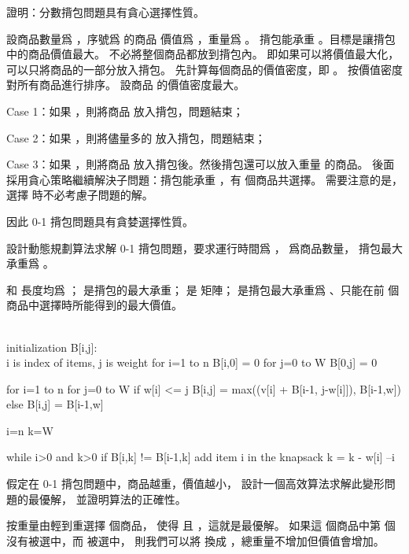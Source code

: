 \startsection[
  title={Elements of the greedy strategy},
]

\startEXERCISE
證明：分數揹包問題具有貪心選擇性質。
\stopEXERCISE

\startANSWER
設商品數量爲 ，序號爲  的商品
價值爲 ，重量爲 。
揹包能承重 。目標是讓揹包中的商品價值最大。
不必將整個商品都放到揹包內。
即如果可以將價值最大化，可以只將商品的一部分放入揹包。
先計算每個商品的價值密度，即 。
按價值密度對所有商品進行排序。
設商品  的價值密度最大。

\startigBase[n]
\item Case 1：如果 ，則將商品  放入揹包，問題結束；
\item Case 2：如果 ，則將儘量多的  放入揹包，問題結束；
\item Case 3：如果 ，則將商品  放入揹包後。然後揹包還可以放入重量  的商品。
後面採用貪心策略繼續解決子問題：揹包能承重 ，有  個商品共選擇。
需要注意的是，選擇  時不必考慮子問題的解。
\stopigBase

因此 0-1 揹包問題具有貪婪選擇性質。
\stopANSWER

\startEXERCISE
設計動態規劃算法求解 0-1 揹包問題，要求運行時間爲 ，  爲商品數量，
揹包最大承重爲 。
\stopEXERCISE

\startANSWER
{} 和  長度均爲 ；
  是揹包的最大承重；
  是  矩陣；
  是揹包最大承重爲 、只能在前  個商品中選擇時所能得到的最大價值。

\startCLRS
\\ initialization B[i,j]:
\\ i is index of items, j is weight
for i=1 to n
	B[i,0] = 0
for j=0 to W
	B[0,j] = 0

for i=1 to n
	for j=0 to W
		if w[i] <= j
			B[i,j] = max((v[i] + B[i-1, j-w[i]]), B[i-1,w])
		else
			B[i,j] = B[i-1,w]
\stopCLRS

\startCLRS
i=n
k=W

while i>0 and k>0
	if B[i,k] != B[i-1,k]
		add item i in the knapsack
		k = k - w[i]
	--i
\stopCLRS

\stopANSWER

\startEXERCISE
假定在 0-1 揹包問題中，商品越重，價值越小，
設計一個高效算法求解此變形問題的最優解，
並證明算法的正確性。
\stopEXERCISE

\startANSWER
按重量由輕到重選擇  個商品，
使得  且 ，這就是最優解。
如果這  個商品中第  個沒有被選中，而  被選中，
則我們可以將  換成 ，總重量不增加但價值會增加。
\stopANSWER

